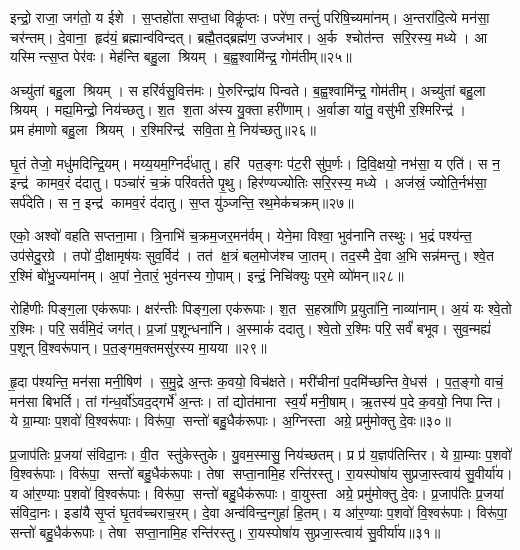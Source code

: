 इन्द्रो॒ राजा॒ जग॑तो॒ य ईशे। स॒प्तहो॑ता सप्त॒धा विकॢ॑प्तः। परे॑ण॒ तन्तुं॑ परिषि॒च्यमा॑नम्। अ॒न्तरा॑दि॒त्ये मन॑सा॒ चर॑न्तम्। दे॒वाना॒ हृद॑यं॒ ब्रह्मान्व॑विन्दत्। ब्रह्मै॒तद्ब्रह्म॑ण॒ उज्ज॑भार। अ॒र्क श्चोत॑न्त सरि॒रस्य॒ मध्ये। आ यस्मिन्त्स॒प्त पेर॑वः। मेह॑न्ति बहु॒ला श्रियम्। ब॒ह्व॒श्वामि॑न्द्र॒ गोम॑तीम्॥२५॥%

अच्यु॑तां बहु॒ला श्रियम्। स हरि॑र्वसु॒वित्त॑मः। पे॒रुरिन्द्रा॑य पिन्वते। ब॒ह्व॒श्वामि॑न्द्र॒ गोम॑तीम्। अच्यु॑तां बहु॒ला श्रियम्। मह्य॒मिन्द्रो॒ निय॑च्छतु। श॒त श॒ता अ॑स्य यु॒क्ता हरी॑णाम्। अ॒र्वाङा या॑तु॒ वसु॑भी र॒श्मिरिन्द्र॑। प्रमह॑माणो बहु॒ला श्रियम्। र॒श्मिरिन्द्र॑ सवि॒ता मे॒ निय॑च्छतु॥२६॥%

घृ॒तं तेजो॒ मधु॑मदिन्द्रि॒यम्। मय्य॒यम॒ग्निर्द॑धातु। हरि॑ पत॒ङ्गः प॑ट॒री सु॑प॒र्णः। दि॒वि॒क्षयो॒ नभ॑सा॒ य एति॑। स न॒ इन्द्र॑ कामव॒रं द॑दातु। पञ्चा॑रं च॒क्रं परि॑वर्तते पृ॒थु। हिर॑ण्यज्योतिः सरि॒रस्य॒ मध्ये। अज॑स्रं॒ ज्योति॒र्नभ॑सा॒ सर्प॑देति। स न॒ इन्द्र॑ कामव॒रं द॑दातु। स॒प्त यु॑ञ्जन्ति॒ रथ॒मेक॑चक्रम्॥२७॥%

एको॒ अश्वो॑ वहति सप्तना॒मा। त्रि॒नाभि॑ च॒क्रम॒जर॒मन॑र्वम्। येने॒मा विश्वा॒ भुव॑नानि तस्थुः। भ॒द्रं पश्य॑न्त॒ उप॑सेदु॒रग्रे। तपो॑ दी॒क्षामृष॑यः सुव॒र्विद॑। तत॑ क्ष॒त्रं बल॒मोज॑श्च जा॒तम्। तद॒स्मै दे॒वा अ॒भि सन्न॑मन्तु। श्वे॒त र॒श्मिं बो॑भु॒ज्यमा॑नम्। अ॒पां ने॒तारं॒ भुव॑नस्य गो॒पाम्। इन्द्रं॒ निचि॑क्युः पर॒मे व्यो॑मन्॥२८॥

रोहि॑णीः पिङ्ग॒ला एक॑रूपाः। क्षर॑न्तीः पिङ्ग॒ला एक॑रूपाः। श॒त स॒हस्रा॑णि प्र॒युता॑नि॒ नाव्या॑नाम्। अ॒यं यः श्वे॒तो र॒श्मिः। परि॒ सर्व॑मि॒दं जग॑त्। प्र॒जां प॒शून्धना॑नि। अ॒स्माकं॑ ददातु। श्वे॒तो र॒श्मिः परि॒ सर्वं॑ बभूव। सुव॒न्मह्यं॑ प॒शून् वि॒श्वरू॑पान्। प॒त॒ङ्गम॒क्तमसु॑रस्य मा॒यया॥२९॥%

हृ॒दा प॑श्यन्ति॒ मन॑सा मनी॒षिण॑। स॒मु॒द्रे अ॒न्तः क॒वयो॒ विच॑क्षते। मरी॑चीनां प॒दमि॑च्छन्ति वे॒धस॑। प॒त॒ङ्गो वाचं॒ मन॑सा बिभर्ति। तां ग॑न्ध॒र्वो॑ऽवद॒द्गर्भे॑ अ॒न्तः। तां द्योत॑माना स्व॒र्यं॑ मनी॒षाम्। ऋ॒तस्य॑ प॒दे क॒वयो॒ निपान्ति। ये ग्रा॒म्याः प॒शवो॑ वि॒श्वरू॑पाः। विरू॑पा॒ सन्तो॑ बहु॒धैक॑रूपाः। अ॒ग्निस्ता अग्रे॒ प्रमु॑मोक्तु दे॒वः॥३०॥

प्र॒जाप॑तिः प्र॒जया॑ संविदा॒नः। वी॒त स्तु॑केस्तुके। यु॒वम॒स्मासु॒ निय॑च्छतम्। प्र प्र॑ य॒ज्ञप॑तिन्तिर। ये ग्रा॒म्याः प॒शवो॑ वि॒श्वरू॑पाः। विरू॑पा॒ सन्तो॑ बहु॒धैक॑रूपाः। तेषा सप्ता॒नामि॒ह रन्ति॑रस्तु। रा॒यस्पोषा॑य सुप्रजा॒स्त्वाय॑ सु॒वीर्या॑य। य आ॑र॒ण्याः प॒शवो॑ वि॒श्वरू॑पाः। विरू॑पा॒ सन्तो॑ बहु॒धैक॑रूपाः। वा॒युस्ता अग्रे॒ प्रमु॑मोक्तु दे॒वः। प्र॒जाप॑तिः प्र॒जया॑ संविदा॒नः। इडा॑यै सृ॒प्तं घृ॒तव॑च्चराच॒रम्। दे॒वा अन्व॑विन्द॒न्गुहा॑ हि॒तम्। य आ॑र॒ण्याः प॒शवो॑ वि॒श्वरू॑पाः। विरू॑पा॒ सन्तो॑ बहु॒धैक॑रूपाः। तेषा सप्ता॒नामि॒ह रन्ति॑रस्तु। रा॒यस्पोषा॑य सुप्रजा॒स्त्वाय॑ सु॒वीर्या॑य॥३१॥
\anuvakamend[आ॒त्मा जना॑नां  विकु॒र्वन्तं॑  विप॒श्चिं प्र॒जानां वसु॒धानीं  वि॒राजं॒ चर॑न्तं॒  गोम॑तीं मे॒ निय॑च्छ॒त्वेक॑चक्रं॒ व्यो॑मन्मा॒यया॑ दे॒व एक॑रूपा अ॒ष्टौ च॑]

